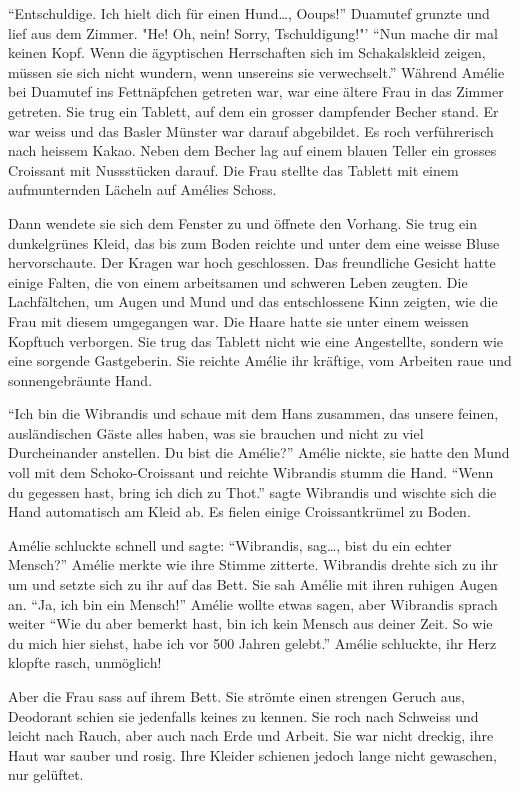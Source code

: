 \documentclass[11pt,titlepage,a5paper]{book}
\begin{document}
 "`Entschuldige. Ich hielt dich für einen Hund\dots, Ooups!"' Duamutef grunzte und lief aus dem Zimmer. "He! Oh, nein! Sorry, Tschuldigung!"' "`Nun mache dir mal keinen Kopf. Wenn die ägyptischen Herrschaften sich im Schakalskleid zeigen, müssen sie sich nicht wundern, wenn unsereins sie verwechselt."' Während Amélie bei Duamutef ins Fettnäpfchen getreten war, war eine ältere Frau in das Zimmer getreten. Sie trug ein Tablett, auf dem ein grosser dampfender Becher stand. Er war weiss und das Basler Münster war darauf abgebildet. Es roch verführerisch nach heissem Kakao. Neben dem Becher lag auf einem blauen Teller ein grosses Croissant mit Nussstücken darauf. Die Frau stellte das Tablett mit einem aufmunternden Lächeln auf Amélies Schoss.
 
 Dann wendete sie sich dem Fenster zu und öffnete den Vorhang. Sie trug ein dunkelgrünes Kleid, das bis zum Boden reichte und unter dem eine weisse Bluse hervorschaute. Der Kragen war hoch geschlossen. Das freundliche Gesicht hatte einige Falten, die von einem arbeitsamen und schweren Leben zeugten. Die Lachfältchen, um Augen und Mund und das entschlossene Kinn zeigten, wie die Frau mit diesem umgegangen war. Die Haare hatte sie unter einem weissen Kopftuch verborgen. Sie trug das Tablett nicht wie eine Angestellte, sondern wie eine sorgende Gastgeberin. Sie reichte Amélie ihr kräftige, vom Arbeiten raue und sonnengebräunte Hand.
 
"`Ich bin die Wibrandis und schaue mit dem Hans zusammen, das unsere feinen,  ausländischen Gäste alles haben, was sie brauchen und nicht zu viel Durcheinander anstellen. Du bist die Amélie?"' Amélie nickte, sie hatte den Mund voll mit dem Schoko-Croissant und reichte Wibrandis stumm die Hand. "`Wenn du gegessen hast, bring ich dich zu Thot."' sagte Wibrandis und wischte sich die Hand automatisch am Kleid ab. Es fielen einige Croissantkrümel zu Boden.

 Amélie schluckte schnell und sagte: "`Wibrandis, sag\dots, bist du ein echter Mensch?"' Amélie merkte wie ihre Stimme zitterte. Wibrandis drehte sich zu ihr um und setzte sich zu ihr auf das Bett. Sie sah Amélie mit ihren ruhigen Augen an. "`Ja, ich bin ein Mensch!"' Amélie wollte etwas sagen, aber Wibrandis sprach weiter "`Wie du aber bemerkt hast, bin ich kein Mensch aus deiner Zeit. So wie du mich hier siehst, habe ich vor 500 Jahren gelebt."' Amélie schluckte, ihr Herz klopfte rasch, unmöglich!
 
Aber die Frau sass auf ihrem Bett. Sie strömte einen strengen Geruch aus, Deodorant schien sie jedenfalls keines zu kennen. Sie roch nach Schweiss und leicht nach Rauch, aber auch nach Erde und Arbeit. Sie war nicht dreckig, ihre Haut war sauber und rosig. Ihre Kleider schienen jedoch lange nicht gewaschen, nur gelüftet. 
\end{document}
